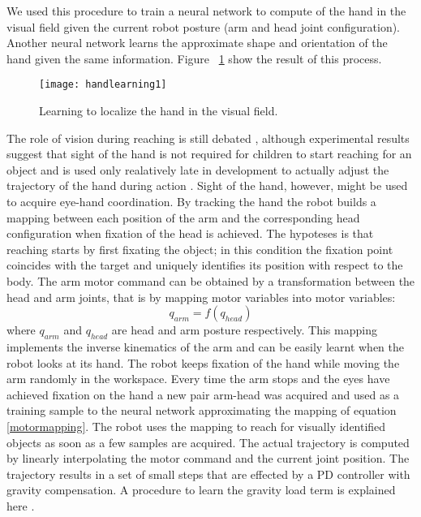 We used this procedure to train a neural network to compute of the hand in the visual field given the current robot posture (arm and head joint configuration). Another neural network learns the approximate shape and orientation of the hand given the same information. Figure ~\ref{sec-handlearning1} show the result of this process. 

\begin{figure}
\centering
\texttt{[image: handlearning1]}
\caption{Learning to localize the hand in the visual field.}
\label{sec-handlearning1}
\end{figure}

The role of vision during reaching is still debated \cite{saunders03humans}, although experimental results suggest that sight of the hand is not required for children to start reaching for an object \cite{clifton93isvisually,clifton94multimodal} and is used only realatively late in development to actually adjust the trajectory of the hand during action \cite{ashmead93visual}. 
Sight of the hand, however, might be used to acquire eye-hand coordination. By tracking the hand the robot builds a mapping between each position of the arm and the corresponding head configuration when fixation of the head is achieved. The hypoteses is that reaching starts by first fixating the object; in this condition the fixation point coincides with the target and uniquely identifies its position with respect to the body. The arm motor command can be obtained by a transformation between the head and arm joints, that is by mapping motor variables into motor variables:
\begin{equation}q_{arm}=f(q_{head})\label{motormapping}\end{equation}
where $q_{arm}$ and $q_{head}$ are head and arm posture respectively. This mapping implements the inverse kinematics of the arm and can be easily learnt when the robot looks at its hand. The robot keeps fixation of the hand while moving the arm randomly in the workspace. Every time the arm stops and the eyes have achieved fixation on the hand a new pair arm-head was acquired and used as a training sample to the neural network approximating the mapping of equation \ref{motormapping}. The robot uses the mapping to reach for visually identified objects as soon as a few samples are acquired.
The actual trajectory is computed by linearly interpolating the motor command and the current joint position. The trajectory results in a set of small steps that are effected by a PD controller with gravity compensation. A procedure to learn the gravity load term is explained here \cite{natale04thesis}.
